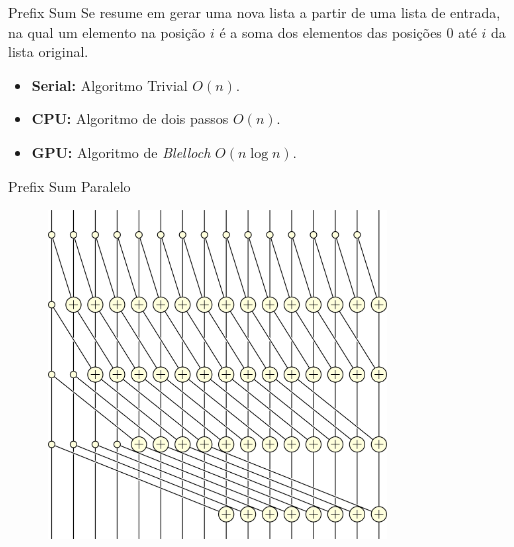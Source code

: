 \begin{frame}{Prefix Sum}
    Se resume em gerar uma nova lista a partir de uma lista de entrada, na qual um elemento na posição $i$ é a soma dos elementos das posições $0$ até $i$ da lista original.
    \vspace{1em}
    \begin{itemize}
        \item \textbf{Serial:} Algoritmo Trivial $O(n)$.
        \item \textbf{CPU:} Algoritmo de dois passos $O(n)$.
        \item \textbf{GPU:} Algoritmo de \textit{Blelloch} $O(n \log n)$.
    \end{itemize}
\end{frame}

\begin{frame}{Prefix Sum Paralelo}
    \begin{figure}
        \centering
        \includegraphics[width=0.8\textwidth]{Figuras/Hillis-Steele Prefix Sum.svg.png}
    \end{figure}
\end{frame}

